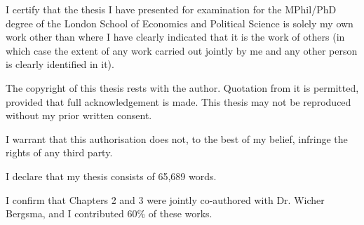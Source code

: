 I certify that the thesis I have presented for examination for the MPhil/PhD degree of the London School of Economics and Political Science is solely my own work other than where I have clearly indicated that it is the work of others (in which case the extent of any work carried out jointly by me and any other person is clearly identified in it).

The copyright of this thesis rests with the author. Quotation from it is permitted, provided that full acknowledgement is made. This thesis may not be reproduced without my prior written consent.

I warrant that this authorisation does not, to the best of my belief, infringe the rights of any third party.

I declare that my thesis consists of 65,689 words.

I confirm that Chapters 2 and 3 were jointly co-authored with Dr. Wicher Bergsma, and I contributed 60\% of these works.
